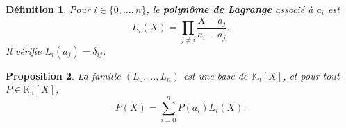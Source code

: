 \documentclass[11pt,a4paper]{article}
\newtheorem{definition}{Définition}[section]
\newtheorem{proposition}[definition]{Proposition}
\theoremstyle{remark}
\newcommand{\K}{\mathbb{K}}
\begin{document}
\begin{definition}
Pour \(i\in\{0,\dots,n\}\), le \textbf{polynôme de Lagrange} associé à \(a_i\) est
\[
L_i(X)=\prod_{j\ne i}\frac{X-a_j}{a_i-a_j}.
\]
Il vérifie \(L_i(a_j)=\delta_{ij}\).
\end{definition}

\begin{proposition}
La famille \((L_0,\dots,L_n)\) est une base de \(\K_n[X]\), et pour tout \(P\in\K_n[X]\),
\[
P(X)=\sum_{i=0}^n P(a_i)L_i(X).
\]
\end{proposition}
\end{document}
